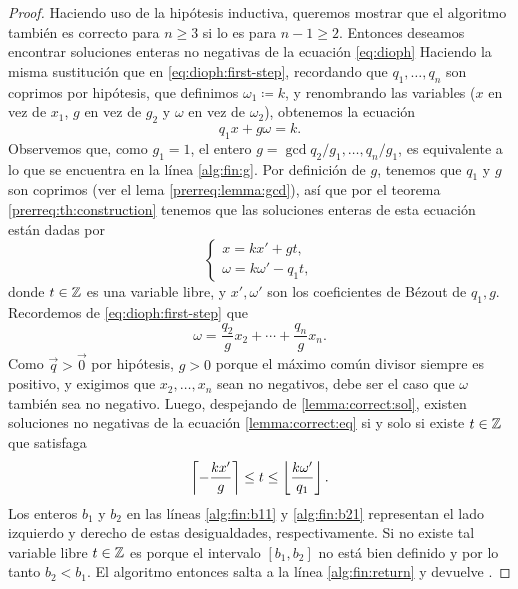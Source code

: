 \begin{proof}
	Haciendo uso de la hipótesis inductiva, queremos mostrar que el algoritmo también es correcto
	para $n \geq 3$ si lo es para $n - 1 \geq 2$. Entonces deseamos encontrar soluciones enteras no
	negativas de la ecuación \eqref{eq:dioph} Haciendo la misma sustitución que en
	\eqref{eq:dioph:first-step}, recordando que $q_1, \ldots, q_n$ son coprimos por hipótesis, que
	definimos $\omega_1 \coloneq k$, y renombrando las variables ($x$ en vez de $x_1$, $g$ en vez de
	$g_2$ y $\omega$ en vez de $\omega_2$), obtenemos la ecuación
	\begin{equation}
		\label{lemma:correct:eq}
		q_1x + g\omega = k.
	\end{equation}
	Observemos que, como $g_1 = 1$, el entero $g = \gcd{q_2/g_1, \ldots, q_n/g_1}$, es equivalente a
	lo que se encuentra en la línea \ref{alg:fin:g}. Por definición de $g$, tenemos que $q_1$ y $g$
	son coprimos (ver el lema \ref{prerreq:lemma:gcd}), así que por el teorema
	\ref{prerreq:th:construction} tenemos que las soluciones enteras de esta ecuación están dadas por
	\begin{equation}
		\label{lemma:correct:sol}
		\begin{cases}
			x = kx' + gt, \\
			\omega = k\omega' - q_1t,
		\end{cases}
	\end{equation}
	donde $t \in \mathbb{Z}$ es una variable libre, y $x', \omega'$ son los coeficientes de Bézout de $q_1,
	g$. Recordemos de \eqref{eq:dioph:first-step} que
	\begin{equation}
		\label{lemma:correct:eq-omega}
		\omega = \frac{q_2}{g}x_2 + \cdots + \frac{q_n}{g}x_n.
	\end{equation}
	Como $\vec{q} > \vec{0}$ por hipótesis, $g > 0$ porque el máximo común divisor siempre es
	positivo, y exigimos que $x_2, \ldots, x_n$ sean no negativos, debe ser el caso que $\omega$
	también sea no negativo. Luego, despejando de \eqref{lemma:correct:sol}, existen soluciones no
	negativas de la ecuación \eqref{lemma:correct:eq} si y solo si existe $t \in \mathbb{Z}$ que satisfaga
	\begin{equation}
		\label{feas}
		\left\lceil -\frac{kx'}{g} \right\rceil \leq t \leq \left\lfloor \frac{k\omega'}{q_1} \right\rfloor.
	\end{equation}
	Los enteros $b_1$ y $b_2$ en las líneas \ref{alg:fin:b11} y \ref{alg:fin:b21} representan el
	lado izquierdo y derecho de estas desigualdades, respectivamente. Si no existe tal variable
	libre $t \in \mathbb{Z}$ es porque el intervalo $[b_1, b_2]$ no está bien definido y por lo tanto $b_2 <
	b_1$. El algoritmo entonces salta a la línea \ref{alg:fin:return} y devuelve \NIL.


\end{proof}
